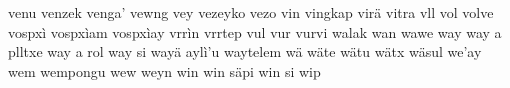 venu\hspace{2mm}
venzek\hspace{2mm}
venga'\hspace{2mm}
vewng\hspace{2mm}
vey\hspace{2mm}
vezeyko\hspace{2mm}
vezo\hspace{2mm}
vin\hspace{2mm}
vingkap\hspace{2mm}
virä\hspace{2mm}
vitra\hspace{2mm}
vll\hspace{2mm}
vol\hspace{2mm}
volve\hspace{2mm}
vospxì\hspace{2mm}
vospxìam\hspace{2mm}
vospxìay\hspace{2mm}
vrrìn\hspace{2mm}
vrrtep\hspace{2mm}
vul\hspace{2mm}
vur\hspace{2mm}
vurvi\hspace{2mm}
walak\hspace{2mm}
wan\hspace{2mm}
wawe\hspace{2mm}
way\hspace{2mm}
way a plltxe\hspace{2mm}
way a rol\hspace{2mm}
way si\hspace{2mm}
wayä aylì'u\hspace{2mm}
waytelem\hspace{2mm}
wä\hspace{2mm}
wäte\hspace{2mm}
wätu\hspace{2mm}
wätx\hspace{2mm}
wäsul\hspace{2mm}
we'ay\hspace{2mm}
wem\hspace{2mm}
wempongu\hspace{2mm}
wew\hspace{2mm}
weyn\hspace{2mm}
win\hspace{2mm}
win säpi\hspace{2mm}
win si\hspace{2mm}
wip\hspace{2mm}
